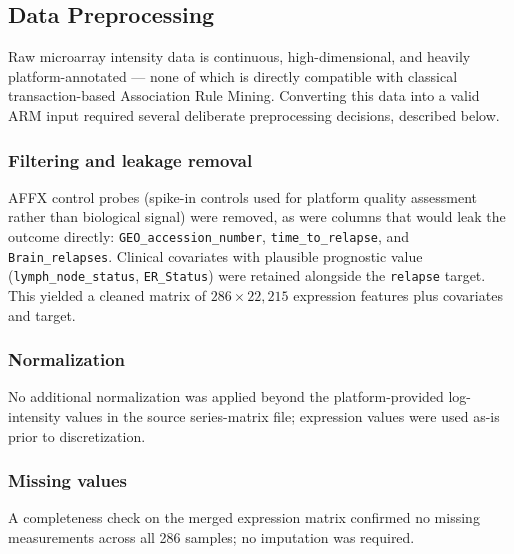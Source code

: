 \documentclass[twocolumn]{article}
\begin{document}
\subsection{Data Preprocessing}
\label{sec:preprocessing}
Raw microarray intensity data is continuous, high-dimensional, and heavily
platform-annotated — none of which is directly compatible with classical
transaction-based Association Rule Mining. Converting this data into a valid ARM
input required several deliberate preprocessing decisions, described below.

\subsubsection{Filtering and leakage removal}
AFFX control probes (spike-in controls used for platform quality assessment rather
than biological signal) were removed, as were columns that would leak the outcome
directly: \texttt{GEO\_accession\_number}, \texttt{time\_to\_relapse}, and
\texttt{Brain\_relapses}. Clinical covariates with plausible prognostic value
(\texttt{lymph\_node\_status}, \texttt{ER\_Status}) were retained alongside the
\texttt{relapse} target. This yielded a cleaned matrix of $286 \times 22{,}215$
expression features plus covariates and target.

\subsubsection{Normalization}
No additional normalization was applied beyond the platform-provided
log-intensity values in the source series-matrix file; expression values
were used as-is prior to discretization.

\subsubsection{Missing values}
A completeness check on the merged expression matrix confirmed no missing
measurements across all 286 samples; no imputation was required.
\end{document}
